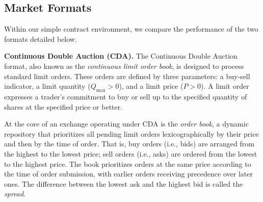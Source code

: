 
\subsection{Market Formats}\label{sect:formatimp}
Within our simple contract environment, we compare the performance of the two formats detailed below. 

\noindent
\textbf{Continuous Double Auction (CDA).}
The Continuous Double Auction format, also known as the \textit{continuous limit order book}, is designed to process standard limit orders.
These orders are defined by three parameters: a buy-sell indicator, a limit quantity (\(Q_{\max}>0\)), and a limit price (\(P>0\)). A limit order expresses a trader's commitment to buy or sell up to the specified quantity of shares at the specified price or better.

At the core of an exchange operating under CDA is the \textit{order book}, a dynamic repository that prioritizes all pending limit orders lexicographically by their price and then by the time of order. That is, buy orders (i.e., bids) are arranged from the highest to the lowest price; sell orders (i.e., asks) are ordered from the lowest to the highest price. The book prioritizes orders at the same price according to the time of order submission, with earlier orders receiving precedence over later ones. The difference between the lowest ask and the highest bid is called the \textit{spread}.

